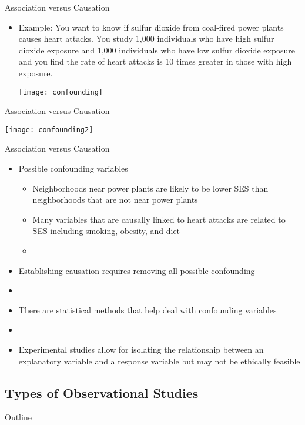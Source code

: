\documentclass[xcolor=dvipsnames]{beamer}
\begin{document}
\begin{frame}{Association versus Causation}
\begin{itemize}
	\item Example: You want to know if sulfur dioxide from coal-fired power plants causes heart attacks. You study 1,000 individuals who have high sulfur dioxide exposure and 1,000 individuals who have low sulfur dioxide exposure and you find the rate of heart attacks is 10 times greater in those with high exposure.
	\begin{center}
		\texttt{[image: confounding]}
	\end{center}
\end{itemize}
\end{frame}

\begin{frame}{Association versus Causation}
	\begin{center}
		\texttt{[image: confounding2]}
	\end{center}
\end{frame}

\begin{frame}{Association versus Causation}
	\begin{itemize}
		\item Possible confounding variables
		\begin{itemize}
			\item Neighborhoods near power plants are likely to be lower SES than neighborhoods that are not near power plants
			\item Many variables that are causally linked to heart attacks are related to SES including smoking, obesity, and diet
			\item[]
		\end{itemize}
		\item Establishing causation requires removing all possible confounding 
		\item[]
		\item There are statistical methods that help deal with confounding variables
		\item[]
		\item Experimental studies allow for isolating the relationship between an explanatory variable and a response variable but may not be ethically feasible 
	\end{itemize}
\end{frame}

\subsection{Types of Observational Studies}
\begin{frame}{Outline}
\tableofcontents[currentsection,subsectionstyle=show/shaded/hide]
\end{frame}
\end{document}
